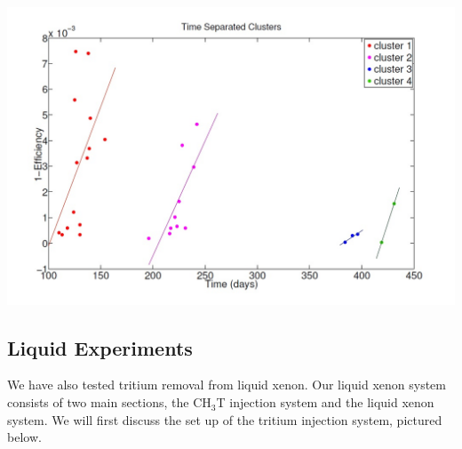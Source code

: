 \documentclass[a4paper,12pt]{article}
\begin{document}
\begin{center}
\includegraphics[scale=0.5]{Figfour.jpg}
\end{center}

\subsection{Liquid Experiments}

We have also tested tritium removal from liquid xenon.  Our liquid xenon system consists of two main sections, the CH$_3$T injection system and the liquid xenon system.  We will first discuss the set up of the tritium injection system, pictured below.
\end{document}
